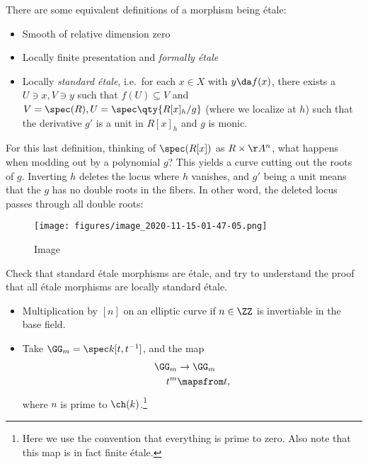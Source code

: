 \begin{remark}

There are some equivalent definitions of a morphism being étale:

\begin{itemize}
\item
  Smooth of relative dimension zero
\item
  Locally finite presentation and \emph{formally étale}
\item
  Locally \emph{standard étale}, i.e.~for each \(x\in X\) with
  \(y\da f(x)\), there exists a \(U\ni x, V\ni y\) such that
  \(f(U) \subseteq V\) and \(V=\spec(R), U = \spec\qty{R[x]_h / g}\)
  (where we localize at \(h\)) such that the derivative \(g'\) is a unit
  in \(R[x]_h\) and \(g\) is monic.
\end{itemize}

For this last definition, thinking of \(\spec(R[x])\) as
\(R\times \AA^n\), what happens when modding out by a polynomial \(g\)?
This yields a curve cutting out the roots of \(g\). Inverting \(h\)
deletes the locus where \(h\) vanishes, and \(g'\) being a unit means
that the \(g\) has no double roots in the fibers. In other word, the
deleted locus passes through all double roots:

\begin{figure}
\centering
\texttt{[image: figures/image\_2020-11-15-01-47-05.png]}
\caption{Image}
\end{figure}

\end{remark}

\begin{exercise}[?]

Check that standard étale morphisms are étale, and try to understand the
proof that all étale morphisms are locally standard étale.

\end{exercise}

\begin{example}

\envlist

\begin{itemize}
\item
  Multiplication by \([n]\) on an elliptic curve if \(n \in \ZZ\) is
  invertiable in the base field.
\item
  Take \(\GG_m = \spec k[t, t^{-1}]\), and the map
  \begin{align*}  
  \GG_m &\to \GG_m \\
   t^m &\mapsfrom t
  ,\end{align*} where \(n\) is prime to \(\ch(k)\).\footnote{Here we use
    the convention that everything is prime to zero. Also note that this
    map is in fact finite étale.}
\end{itemize}

\end{example}

